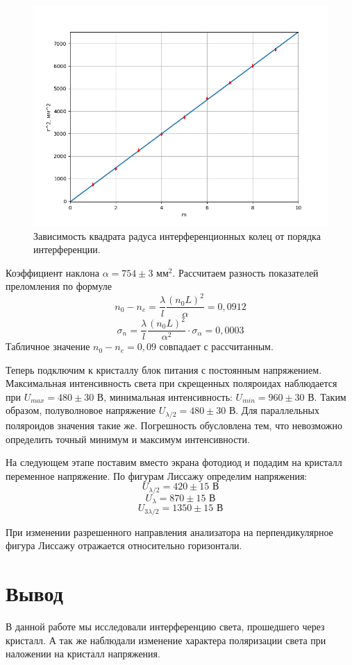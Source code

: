 \documentclass[a4paper,12pt]{article}
\begin{document}
\begin{figure}[h!]
	\begin{center}
		\includegraphics[scale = 0.5]{3.png}
	\end{center}
	\caption{Зависимость квадрата радуса интерференционных колец от порядка интерференции.}
\end{figure}


	Коэффициент наклона $\alpha = 754\pm3$ мм$^2$. Рассчитаем разность показателей преломления по формуле
	\[
		n_0 - n_e = \frac{\lambda}{l}\frac{(n_0L)^2}{\alpha} = 0,0912
	\]
	\[
	\sigma_n = \frac{\lambda}{l}\frac{(n_0L)^2}{\alpha^2}\cdot\sigma_\alpha = 0,0003
	\]
	Табличное значение $n_0 - n_e = 0,09$ совпадает с рассчитанным.
	
	Теперь подключим к кристаллу блок питания с постоянным напряжением. Максимальная интенсивность света при скрещенных поляроидах наблюдается при $U_{max} = 480\pm30$ В, минимальная интенсивность: $U_{min} = 960\pm30$ В. Таким образом, полуволновое напряжение $U_{\lambda/2} = 480 \pm 30$ В. Для параллельных поляроидов значения такие же. Погрешность обусловлена тем, что невозможно определить точный минимум и максимум интенсивности.
	
\newpage 
На следующем этапе поставим вместо экрана фотодиод и подадим на кристалл переменное напряжение. По фигурам Лиссажу определим напряжения:
	\[
		U_{\lambda/2} = 420 \pm 15 \text{ В}
	\]
	\[
		U_{\lambda} = 870 \pm 15\text{ В}
	\]
	\[
		U_{3\lambda/2} = 1350 \pm 15\text{ В}
	\]
	
	При изменении разрешенного направления анализатора на перпендикулярное фигура Лиссажу отражается относительно горизонтали.
	
	\section{Вывод}
	В данной работе мы исследовали интерференцию света, прошедшего через кристалл. А так же наблюдали изменение характера поляризации света при наложении на кристалл напряжения.
\end{document}
